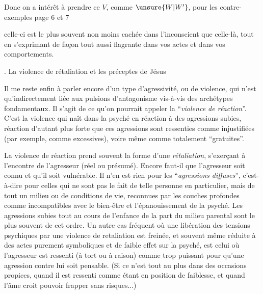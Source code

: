 Donc on a intérêt à prendre ce $V$,  
comme $\unsure{W|W'}$, pour les contre-exemples page $6$ et $7$


celle-ci est le plus souvent non moins cachée dans l’inconscient que celle-là, tout en s’exprimant de façon tout aussi flagrante dans vos actes et dans vos comportements.

. La violence de rétaliation et les préceptes de Jésus

Il me reste enfin à parler encore d’un type d’agressivité, ou de violence, qui n’est qu’indirectement liée aux pulsions d’antagonisme vis-à-vis des archétypes fondamentaux. Il s’agit de ce qu’on pourrait appeler la ``\textit{violence de réaction}''. C’est la violence qui naît dans la psyché en réaction à des agressions subies, réaction d’autant plus forte que ces agressions sont ressenties comme injustifiées (par exemple, comme excessives), voire même comme totalement ``gratuites''.

La violence de réaction prend souvent la forme d’une \textit{rétaliation}, s’exerçant à l’encontre de l’agresseur (réel ou présumé). Encore faut-il que l’agresseur soit connu et qu’il soit vulnérable. Il n’en est rien pour les ``\textit{agressions diffuses}'', c’est-à-dire pour celles qui ne sont pas le fait de telle personne en particulier, mais de tout un milieu ou de conditions de vie, reconnues par les couches profondes comme incompatibles avec le bien-être et l’épanouissement de la psyché. Les agressions subies tout au cours de l’enfance de la part du milieu parental sont le plus souvent de cet ordre. Un autre cas fréquent où une libération des tensions psychiques par une violence de retaliation est freinée, et souvent même réduite à des actes purement symboliques et de faible effet sur la psyché, est celui où l’agresseur est ressenti (à tort ou à raison) comme trop puissant pour qu’une agression contre lui soit pensable. (Si ce n’est tout au plus dans des occasions propices, quand il est ressenti comme étant en position de faiblesse, et quand l’âme croit pouvoir frapper sans risques...)

